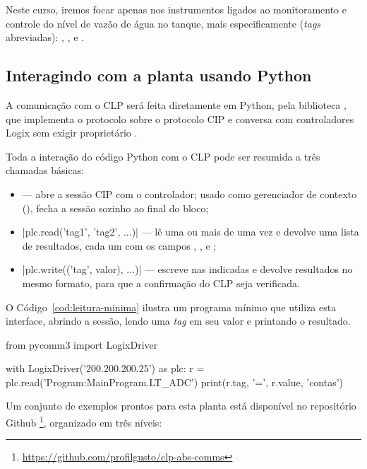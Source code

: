 Neste curso, iremos focar apenas nos instrumentos ligados ao monitoramento e controle do nível de vazão de água no tanque, mais especificamente (\textit{tags} abreviadas): , ,  e .


\subsection{Interagindo com a planta usando Python}
A comunicação com o CLP será feita diretamente em Python, pela biblioteca , que implementa o protocolo  sobre o protocolo CIP e conversa com controladores Logix sem exigir  proprietário \cite{pycomm3,odva-cip}. 

Toda a interação do código Python com o CLP pode ser resumida a três chamadas básicas:
%
\begin{itemize}
  \item {} --- abre a sessão CIP com o controlador; usado como gerenciador de contexto
    (), fecha a sessão sozinho ao final do bloco;
  \item \cd|plc.read('tag1', 'tag2', ...)| --- lê uma ou mais  de uma vez e devolve uma lista de
    resultados, cada um com os campos , ,  e ;
  \item \cd|plc.write(('tag', valor), ...)| --- escreve nas  indicadas e devolve resultados no mesmo
    formato, para que a confirmação do CLP seja verificada.
\end{itemize}

O Código~\ref{cod:leitura-minima} ilustra um programa mínimo que utiliza esta interface, abrindo a sessão, lendo uma \textit{tag} em seu valor  e printando o resultado.

\begin{codigopython}[caption={Programa mínimo de leitura de uma \texttt{tag} com o \texttt{pycomm3}.},
                     label={cod:leitura-minima}]
from pycomm3 import LogixDriver

with LogixDriver('200.200.200.25') as plc:
    r = plc.read('Program:MainProgram.LT_ADC')
    print(r.tag, '=', r.value, 'contas')
\end{codigopython}


Um conjunto de exemplos prontos para esta planta está disponível no repositório Github \footnote{\url{https://github.com/profilgusto/clp-abs-comms}}, organizado em três níveis:

